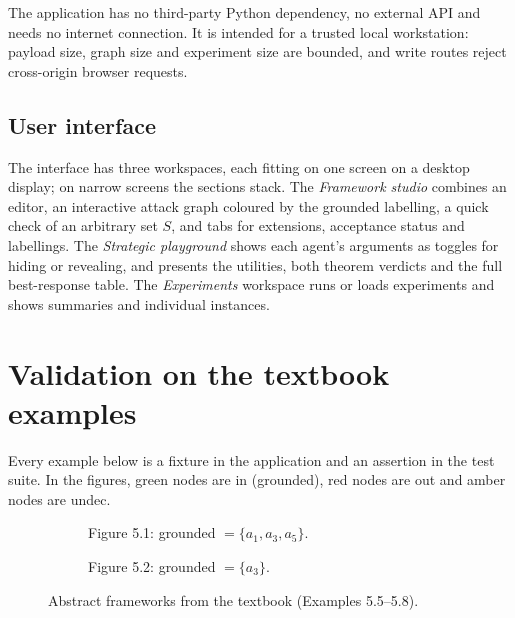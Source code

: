 \documentclass[11pt,a4paper]{article}
\begin{document}
The application has no third-party Python dependency, no external API and needs no internet connection. It is intended for a trusted local workstation: payload size, graph size and experiment size are bounded, and write routes reject cross-origin browser requests.

\subsection{User interface}
The interface has three workspaces, each fitting on one screen on a desktop display; on narrow screens the sections stack. The \emph{Framework studio} combines an editor, an interactive attack graph coloured by the grounded labelling, a quick check of an arbitrary set $S$, and tabs for extensions, acceptance status and labellings. The \emph{Strategic playground} shows each agent's arguments as toggles for hiding or revealing, and presents the utilities, both theorem verdicts and the full best-response table. The \emph{Experiments} workspace runs or loads experiments and shows summaries and individual instances.

\section{Validation on the textbook examples}
Every example below is a fixture in the application and an assertion in the test suite. In the figures, green nodes are \textsf{in} (grounded), red nodes are \textsf{out} and amber nodes are \textsf{undec}.

\begin{figure}[H]
\centering
\begin{subfigure}[t]{0.48\textwidth}
\centering
{}
\caption{Figure 5.1: grounded $=\{a_1,a_3,a_5\}$.}
\end{subfigure}\hfill
\begin{subfigure}[t]{0.48\textwidth}
\centering
{}
\caption{Figure 5.2: grounded $=\{a_3\}$.}
\end{subfigure}
\caption{Abstract frameworks from the textbook (Examples 5.5--5.8).}
\label{fig:book-abstract}
\end{figure}
\end{document}
